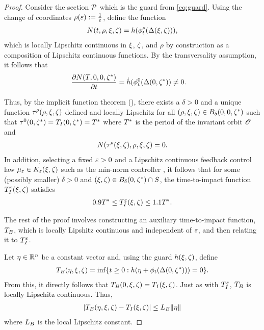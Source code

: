 \begin{proof}
  Consider the \Poincare{} section $\mathcal{P}$ which is the guard from \eqref{eq:guard}.
  Using the change of coordinates $\rho(\varepsilon) := \tfrac{1}{\varepsilon}$, define the function
  \begin{align}
    N(t, \rho, \xi, \zeta) = h(\phi^{\rho}_{t}(\Delta(\xi, \zeta))),
  \end{align}
  which is locally Lipschitz continuous in $\xi$, $\zeta$, and $\rho$ by construction as a composition of Lipschitz continuous functions.
  By the transversality assumption, it follows that
  \begin{align}
    \frac{\partial{N(T, 0, 0, \zeta^{*})}}{\partial{t}} &= \dot h(\phi^{0}_{t} (\Delta(0, \zeta^{*})) \ne 0.
  \end{align}

  Thus, by the implicit function theorem (\cite{Sun2001}), there exists a $\delta > 0$ and a unique function $\tau^{\rho}(\rho, \xi, \zeta)$ defined and locally Lipschitz for all $(\rho, \xi, \zeta) \in B_{\delta}(0, 0, \zeta^{*})$ such that $\tau^{0}(0, \zeta^{*}) = T_{I}(0, \zeta^{*}) = T^{*}$ where $T^{*}$ is the period of the invariant orbit ${\mathscr O}$ and
  \begin{align}
    N(\tau^{\rho}(\xi, \zeta), \rho, \xi, \zeta) = 0.
  \end{align}
  In addition, selecting a fixed  $\varepsilon > 0$ and a Lipschitz continuous feedback control law $\mu_{\varepsilon} \in K_{\varepsilon}(\xi, \zeta)$ such as the min-norm controller \cite{Freeman1996}, it follows that for some (possibly smaller) $\delta > 0$ and $(\xi, \zeta) \in B_{\delta}(0, \zeta^{*}) \cap S$, the time-to-impact function $T_{I}^{\varepsilon}(\xi, \zeta)$ satisfies
  \begin{align}
    \label{eq:TIe-bounds}
    0.9 T^{*} \leq T_{I}^{\varepsilon}(\xi, \zeta) \leq 1.1 T^{*}.
  \end{align}
  
  The rest of the proof involves constructing an auxiliary time-to-impact function, $T_{B}$, which is locally Lipshitz continuous and independent of $\varepsilon$, and then relating it to $T_{I}^{\varepsilon}$.
  
  Let $\eta \in \mathbb{R}^{n}$ be a constant vector and, using the guard $h(\xi, \zeta)$, define
  \begin{align}
    T_{B}(\eta, \xi, \zeta) = \inf\{t \geq 0 : h(\eta + \phi_{t}(\Delta(0, \zeta^{*}))) = 0\}.
  \end{align}
  From this, it directly follows that $T_{B}(0, \xi, \zeta) = T_{I}(\xi, \zeta)$.
  Just as with $T_{I}^{\varepsilon}$, $T_{B}$ is locally Lipschitz continuous.
  Thus,
  \begin{align}
    | T_{B}(\eta, \xi, \zeta) - T_{I}(\xi, \zeta) | \leq L_{B} \| \eta \|
  \end{align}
  where $L_{B}$ is the local Lipschitz constant.


\end{proof}
